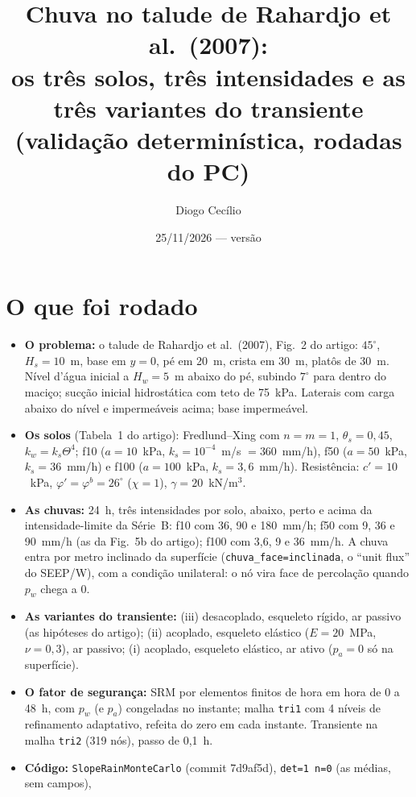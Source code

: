 \documentclass[11pt,a4paper]{article}
\title{Chuva no talude de Rahardjo et al.\ (2007):\\ os três solos, três intensidades e as três variantes do
transiente\\ \large (validação determinística, rodadas do PC)}
\author{Diogo Cecílio}
\date{25/11/2026 --- versão \versao}
\begin{document}
\maketitle
\begin{abstract}

\end{abstract}
\tableofcontents

\section{O que foi rodado}\label{sec:rodado}
\begin{itemize}
  \item \textbf{O problema:} o talude de Rahardjo et al.\ (2007), Fig.~2 do artigo: $45^\circ$, $H_s = 10$~m, base em
    $y = 0$, pé em 20~m, crista em 30~m, platôs de 30~m. Nível d'água inicial a $H_w = 5$~m abaixo do pé, subindo
    $7^\circ$ para dentro do maciço; sucção inicial hidrostática com teto de 75~kPa. Laterais com carga abaixo do nível
    e impermeáveis acima; base impermeável.
  \item \textbf{Os solos} (Tabela~1 do artigo): Fredlund--Xing com $n = m = 1$, $\theta_s = 0{,}45$, $k_w = k_s
    \Theta^4$; f10 ($a = 10$~kPa, $k_s = 10^{-4}$~m/s $= 360$~mm/h), f50 ($a = 50$~kPa, $k_s = 36$~mm/h) e f100
    ($a = 100$~kPa, $k_s = 3{,}6$~mm/h). Resistência: $c' = 10$~kPa, $\varphi' = \varphi^b = 26^\circ$ ($\chi = 1$),
    $\gamma = 20$~kN/m$^3$.
  \item \textbf{As chuvas:} 24~h, três intensidades por solo, abaixo, perto e acima da intensidade-limite da Série~B:
    f10 com 36, 90 e 180~mm/h; f50 com 9, 36 e 90~mm/h (as da Fig.~5b do artigo); f100 com 3,6, 9 e 36~mm/h. A
    chuva entra por metro inclinado da superfície (\texttt{chuva\_face=inclinada}, o ``unit flux'' do SEEP/W), com a
    condição unilateral: o nó vira face de percolação quando $p_w$ chega a 0.
  \item \textbf{As variantes do transiente:} (iii) desacoplado, esqueleto rígido, ar passivo (as hipóteses do artigo);
    (ii) acoplado, esqueleto elástico ($E = 20$~MPa, $\nu = 0{,}3$), ar passivo; (i) acoplado, esqueleto elástico, ar
    ativo ($p_a = 0$ só na superfície).
  \item \textbf{O fator de segurança:} SRM por elementos finitos de hora em hora de 0 a 48~h, com $p_w$ (e $p_a$)
    congeladas no instante; malha \texttt{tri1} com 4 níveis de refinamento adaptativo, refeita do zero em cada
    instante. Transiente na malha \texttt{tri2} (319 nós), passo de 0,1~h.
  \item \textbf{Código:} \texttt{SlopeRainMonteCarlo} (commit 7d9af5d), \texttt{det=1 n=0} (as médias, sem campos),

\end{itemize}
\end{document}
